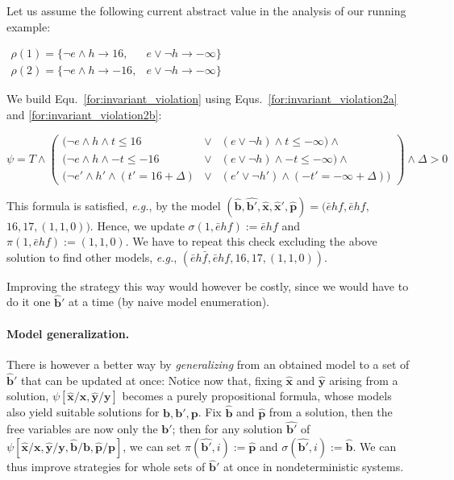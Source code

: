 \documentclass{llncs}
\newcommand{\instance}[1]{\hat{#1}}
\newcommand{\eg}{\textit{e.g.}}
\renewcommand{\vec}[1]{{\boldsymbol #1}}
\newcommand{\verr}{\mathit{e}} \newcommand{\vheat}{\mathit{h}} \newcommand{\vfan}{\mathit{f}}
\begin{document}
\begin{example*}
Let us assume the following current abstract value in the analysis of
our running example:\\[0.6ex]
\centerline{\small $
\begin{array}{ll}
\rho(1)=\{\neg\verr\wedge\vheat \rightarrow 16, &\verr \vee \neg\vheat\rightarrow -\infty\}\\
\rho(2)=\{\neg\verr\wedge\vheat \rightarrow -16, &\verr \vee
\neg\vheat\rightarrow -\infty\}
\end{array}
$}

\noindent We build Equ.~\ref{for:invariant_violation} using 
Equs.~\ref{for:invariant_violation2a} and
\ref{for:invariant_violation2b}:\\[0.6ex]
\centerline{\small $
\psi = T\wedge \left(\begin{array}{lcl}
\big(
\neg\verr\wedge\vheat \wedge t\leq 16
&\vee& (\verr \vee \neg\vheat)\wedge t\leq-\infty
\big) \wedge\\
\big(
\neg\verr\wedge\vheat \wedge -t\leq -16 &\vee&
(\verr \vee \neg\vheat)\wedge -t\leq-\infty
\big) \wedge\\
\big(
\neg\verr'\wedge\vheat' \wedge (t'=16+\Delta) &\vee& 
(\verr' \vee \neg\vheat')\wedge (-t'=-\infty+\Delta)\big) 
\end{array}\right) \wedge
\Delta>0
$}

\noindent This formula is satisfied, \eg, by the model
$(\instance{\vec{b}},\instance{\vec{b}'},\instance{\vec{x}},\instance{\vec{x}}',\instance{\vec{p}})=
(\bar{\verr}\vheat\vfan,\bar{\verr}\vheat\vfan,$ $16,17,(1,1,0))$.
Hence, we update
$\sigma(1,\bar{\verr}\vheat\vfan):=\bar{\verr}\vheat\vfan$ and
$\pi(1,\bar{\verr}\vheat\vfan):=(1,1,0)$.  We have to repeat this
check excluding the above solution to find other models, \eg,
$(\bar{\verr}\vheat\bar{\vfan},\bar{\verr}\vheat\vfan,16,17,(1,1,0))$.
\end{example*}


Improving the strategy this way would however be costly, since we
would have to do it one $\instance{\vec{b}}'$ at a time (by naive model
enumeration). 

\paragraph{Model generalization.}
There is however a better way by \emph{generalizing} from an obtained
model to a set of $\instance{\vec{b}}'$ that can be updated at once:
Notice now that, fixing $\instance{\vec{x}}$ and $\instance{\vec{y}}$
arising from a solution,
$\psi[\instance{\vec{x}}/\vec{x},\instance{\vec{y}}/\vec{y}]$ becomes
a purely propositional formula, whose models also yield suitable
solutions for $\vec{b},\vec{b}',\vec{p}$.
Fix $\instance{\vec{b}}$
and $\instance{\vec{p}}$ from a solution, then the free variables are
now only the $\vec{b}'$; then for any solution $\instance{\vec{b}'}$
of
$\psi[\instance{\vec{x}}/\vec{x},\instance{\vec{y}}/\vec{y},\instance{\vec{b}}/\vec{b},\instance{\vec{p}}/\vec{p}]$,
we can set $\pi(\instance{\vec{b}'},i):=\instance{\vec{p}}$ and
$\sigma(\instance{\vec{b}'},i):=\instance{\vec{b}}$.
We can thus improve strategies for whole sets of $\instance{\vec{b}}'$ at once in nondeterministic systems.
\end{document}
